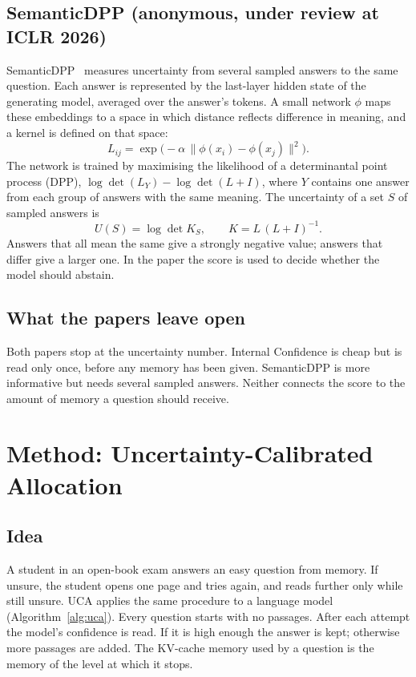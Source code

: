 \documentclass[11pt,a4paper]{article}
\begin{document}
\subsection{SemanticDPP (anonymous, under review at ICLR 2026)}

SemanticDPP~\cite{semanticdpp2026} measures uncertainty from several sampled
answers to the same question. Each answer is represented by the last-layer
hidden state of the generating model, averaged over the answer's tokens. A
small network $\phi$ maps these embeddings to a space in which distance
reflects difference in meaning, and a kernel is defined on that space:
\begin{equation}
L_{ij} = \exp\bigl(-\alpha\,\lVert \phi(x_i)-\phi(x_j)\rVert^2\bigr).
\end{equation}
The network is trained by maximising the likelihood of a determinantal point
process (DPP), $\log\det(L_Y) - \log\det(L+I)$, where $Y$ contains one answer
from each group of answers with the same meaning. The uncertainty of a set $S$
of sampled answers is
\begin{equation}
U(S) = \log\det K_S, \qquad K = L\,(L+I)^{-1}.
\end{equation}
Answers that all mean the same give a strongly negative value; answers that
differ give a larger one. In the paper the score is used to decide whether the
model should abstain.

\subsection{What the papers leave open}

Both papers stop at the uncertainty number. Internal Confidence is cheap but is
read only once, before any memory has been given. SemanticDPP is more
informative but needs several sampled answers. Neither connects the score to
the amount of memory a question should receive.

\section{Method: Uncertainty-Calibrated Allocation}

\subsection{Idea}

A student in an open-book exam answers an easy question from memory. If unsure,
the student opens one page and tries again, and reads further only while still
unsure. UCA applies the same procedure to a language model
(Algorithm~\ref{alg:uca}). Every question starts with no passages. After each
attempt the model's confidence is read. If it is high enough the answer is
kept; otherwise more passages are added. The KV-cache memory used by a question
is the memory of the level at which it stops.
\end{document}
